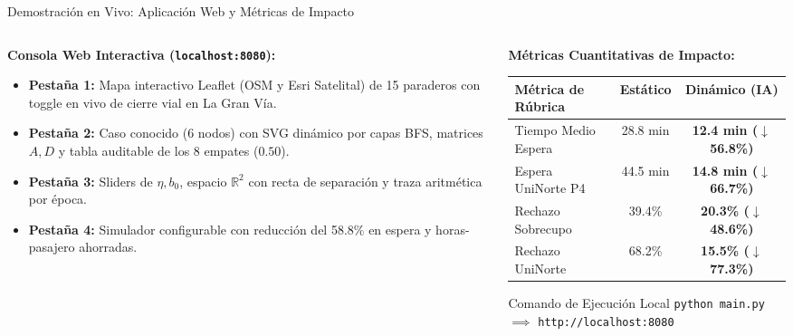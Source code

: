\documentclass[aspectratio=169,10pt]{beamer}
\begin{document}
\begin{frame}{Demostración en Vivo: Aplicación Web y Métricas de Impacto}
    \begin{columns}[T]
        \begin{column}{0.50\textwidth}
            \textbf{Consola Web Interactiva (\texttt{localhost:8080}):}
            \begin{itemize}
                \item \textbf{Pestaña 1:} Mapa interactivo Leaflet (OSM y Esri Satelital) de 15 paraderos con toggle en vivo de cierre vial en La Gran Vía.
                \item \textbf{Pestaña 2:} Caso conocido (6 nodos) con SVG dinámico por capas BFS, matrices $A, D$ y tabla auditable de los 8 empates ($0.50$).
                \item \textbf{Pestaña 3:} Sliders de $\eta, b_0$, espacio $\mathbb{R}^2$ con recta de separación y traza aritmética por época.
                \item \textbf{Pestaña 4:} Simulador configurable con reducción del 58.8\% en espera y horas-pasajero ahorradas.
            \end{itemize}
        \end{column}
        \begin{column}{0.50\textwidth}
            \textbf{Métricas Cuantitativas de Impacto:}
            \centering
            \small
            \begin{tabular}{lcc}
                \toprule
                \textbf{Métrica de Rúbrica} & \textbf{Estático} & \textbf{Dinámico (IA)} \\
                \midrule
                Tiempo Medio Espera & 28.8 min & \textbf{12.4 min ($\downarrow$ 56.8\%)} \\
                Espera UniNorte P4 & 44.5 min & \textbf{14.8 min ($\downarrow$ 66.7\%)} \\
                Rechazo Sobrecupo & 39.4\% & \textbf{20.3\% ($\downarrow$ 48.6\%)} \\
                Rechazo UniNorte & 68.2\% & \textbf{15.5\% ($\downarrow$ 77.3\%)} \\
                \bottomrule
            \end{tabular}
            \vspace{0.2cm}
            \begin{exampleblock}{Comando de Ejecución Local}
                \texttt{python main.py} \quad $\implies$ \quad \texttt{http://localhost:8080}
            \end{exampleblock}
        \end{column}
    \end{columns}
\end{frame}
\end{document}
